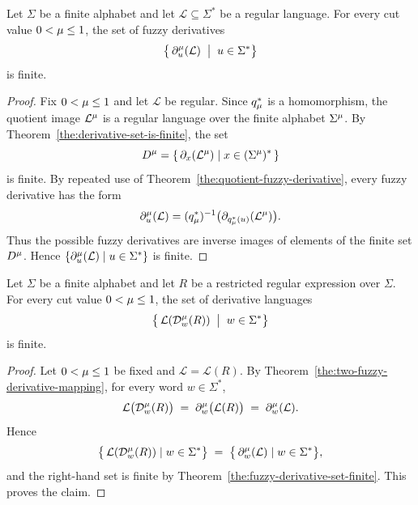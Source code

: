 \begin{theorem}\label{the:fuzzy-derivative-set-finite}
Let $\Sigma$ be a finite alphabet and let $\mathcal{L} \subseteq \Sigma^*$ be a
regular language. For every cut value $0 < \mu \le 1$, the set of fuzzy
derivatives
\[
  \bigl\{\, \partial_u^\mu(\mathcal{L}) \;\bigm|\; u \in \Sigma^* \bigr\}
\]
is finite.
\end{theorem}

\begin{proof}
Fix $0 < \mu \le 1$ and let $\mathcal{L}$ be regular. Since $q_\mu^*$ is a
homomorphism, the quotient image $\mathcal L^\mu$ is a regular language over
the finite alphabet $\Sigma^\mu$. By Theorem~\ref{the:derivative-set-is-finite},
the set
\[
  D^\mu
  =
  \{\,\partial_x(\mathcal L^\mu) \mid x\in(\Sigma^\mu)^*\,\}
\]
is finite. By repeated use of Theorem~\ref{the:quotient-fuzzy-derivative},
every fuzzy derivative has the form
\[
  \partial_u^\mu(\mathcal L)
  =
  (q_\mu^*)^{-1}
  \bigl(\partial_{q_\mu^*(u)}(\mathcal L^\mu)\bigr).
\]
Thus the possible fuzzy derivatives are inverse images of elements of the finite
set $D^\mu$. Hence
$\{\partial_u^\mu(\mathcal{L}) \mid u \in \Sigma^*\}$ is finite.
\end{proof}



\begin{theorem}\label{the:regex-fuzzy-derivative-types-finite}
Let $\Sigma$ be a finite alphabet and let $R$ be a restricted regular expression over
$\Sigma$. For every cut value $0 < \mu \le 1$, the set of derivative languages
\[
  \bigl\{\, \mathcal{L}(\mathcal{D}^\mu_{w}(R)) \;\bigm|\; w \in \Sigma^* \bigr\}
\]
is finite.
\end{theorem}

\begin{proof}
Let $0 < \mu \le 1$ be fixed and $\mathcal{L} = \mathcal{L}(R)$.
By Theorem~\ref{the:two-fuzzy-derivative-mapping}, for every word $w \in \Sigma^*$,
\[
  \mathcal{L}\bigl(\mathcal{D}^\mu_w(R)\bigr)
  \;=\;
  \partial^\mu_w\bigl(\mathcal{L}(R)\bigr)
  \;=\;
  \partial^\mu_w(\mathcal{L}).
\]
Hence
\[
  \bigl\{\, \mathcal{L}(\mathcal{D}^\mu_{w}(R)) \mid w \in \Sigma^* \bigr\}
  \;=\;
  \bigl\{\, \partial^\mu_w(\mathcal{L}) \mid w \in \Sigma^* \bigr\},
\]
and the right-hand set is finite by
Theorem~\ref{the:fuzzy-derivative-set-finite}. This proves the claim.
\end{proof}



